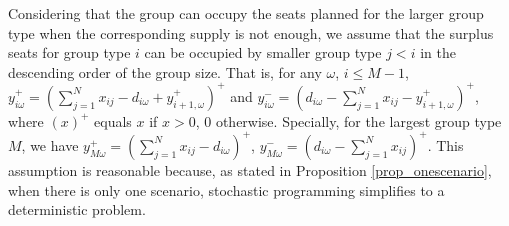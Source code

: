 Considering that the group can occupy the seats planned for the larger group type when the corresponding supply is not enough, we assume that the surplus seats for group type $i$ can be occupied by smaller group type $j<i$ in the descending order of the group size. That is, for any $\omega$, $i \leq M-1$, $y_{i \omega}^{+}=\left(\sum_{j=1}^N x_{ij}- d_{i \omega} + y_{i+1, \omega}^{+}\right)^{+}$ and $y_{i \omega}^{-}=\left(d_{i \omega}- \sum_{j=1}^N x_{ij} - y_{i+1, \omega}^{+} \right)^{+}$, where $(x)^{+}$ equals $x$ if $x>0$, $0$ otherwise. Specially, for the largest group type $M$, we have $y_{M \omega}^{+} = (\sum_{j=1}^N x_{ij} - d_{i \omega})^{+}$, $y_{M \omega}^{-} = (d_{i \omega}- \sum_{j=1}^N x_{ij})^{+}$. This assumption is reasonable because, as stated in Proposition \ref{prop_onescenario}, when there is only one scenario, stochastic programming simplifies to a deterministic problem.







